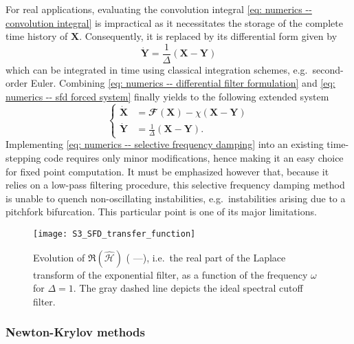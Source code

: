     For real applications, evaluating the convolution integral \eqref{eq: numerics -- convolution integral} is impractical as it necessitates the storage of the complete time history of $\mathbf{X}$. Consequently, it is replaced by its differential form given by
    \begin{equation}
      \dot{\mathbf{Y}} = \displaystyle \frac{1}{\Delta} \left( \mathbf{X} - \mathbf{Y} \right)
      \label{eq: numerics -- differential filter formulation}
    \end{equation}
    which can be integrated in time using classical integration schemes, e.g.\ second-order Euler. Combining \eqref{eq: numerics -- differential filter formulation} and \eqref{eq: numerics -- sfd forced system} finally yields to the following extended system
    \begin{equation}
      \left\{
      \begin{aligned}
        \dot{\mathbf{X}} & = \mathbfcal{F}\left( \mathbf{X} \right) - \chi \left( \mathbf{X} - \mathbf{Y} \right) \\
        \dot{\mathbf{Y}} & = \displaystyle \frac{1}{\Delta} \left( \mathbf{X} - \mathbf{Y} \right).
      \end{aligned}
      \right.
      \label{eq: numerics -- selective frequency damping}
    \end{equation}
    Implementing \eqref{eq: numerics -- selective frequency damping} into an existing time-stepping code requires only minor modifications, hence making it an easy choice for fixed point computation. It must be emphasized however that, because it relies on a low-pass filtering procedure, this selective frequency damping method is unable to quench non-oscillating instabilities, e.g.\ instabilities arising due to a pitchfork bifurcation. This particular point is one of its major limitations.

    \begin{figure}[b]
      \sidecaption
      \texttt{[image: S3\_SFD\_transfer\_function]}
      \caption{Evolution of $\Re \left( \hat{\mathcal{H}} \right)$ ({\color{blue} ---}), i.e.\ the real part of the Laplace transform of the exponential filter, as a function of the frequency $\omega$ for $\Delta=1$. The gray dashed line depicts the ideal spectral cutoff filter.}
      \label{fig: numerics -- lapalce transform}
    \end{figure}

    \subsubsection{Newton-Krylov methods}
    \label{subsubsec: numerics -- newton-krylov methods}

